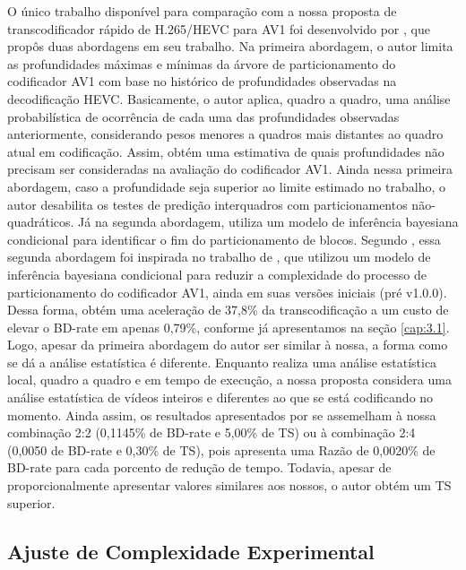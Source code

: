 O único trabalho disponível para comparação com a nossa proposta de transcodificador rápido de H.265/HEVC para AV1 foi desenvolvido por \citet{bib:chen_2019}, que propôs duas abordagens em seu trabalho. Na primeira abordagem, o autor limita as profundidades máximas e mínimas da árvore de particionamento do codificador AV1 com base no histórico de profundidades observadas na decodificação HEVC. Basicamente, o autor aplica, quadro a quadro, uma análise probabilística de ocorrência de cada uma das profundidades observadas anteriormente, considerando pesos menores a quadros mais distantes ao quadro atual em codificação. Assim, obtém uma estimativa de quais profundidades não precisam ser consideradas na avaliação do codificador AV1. Ainda nessa primeira abordagem, caso a profundidade seja superior ao limite estimado no trabalho, o autor desabilita os testes de predição interquadros com particionamentos não-quadráticos. Já na segunda abordagem, \citet{bib:chen_2019} utiliza um modelo de inferência bayesiana condicional \cite{bib:bayesian_ref} para identificar o fim do particionamento de blocos. Segundo \citet{bib:chen_2019}, essa segunda abordagem foi inspirada no trabalho de \cite{bib:guo2_2018}, que utilizou um modelo de inferência bayesiana condicional para reduzir a complexidade do processo de particionamento do codificador AV1, ainda em suas versões iniciais (pré v1.0.0). Dessa forma, \citet{bib:chen_2019} obtém uma aceleração de 37,8\% da transcodificação a um custo de elevar o BD-rate em apenas 0,79\%, conforme já apresentamos na seção \ref{cap:3.1}. Logo, apesar da primeira abordagem do autor ser similar à nossa, a forma como se dá a análise estatística é diferente. Enquanto \citet{bib:chen_2019} realiza uma análise estatística local, quadro a quadro e em tempo de execução, a nossa proposta considera uma análise estatística de vídeos inteiros e diferentes ao que se está codificando no momento. Ainda assim, os resultados apresentados por \citet{bib:chen_2019} se assemelham à nossa combinação 2:2 (0,1145\% de BD-rate e 5,00\% de TS) ou à combinação 2:4 (0,0050 de BD-rate e 0,30\% de TS), pois \citet{bib:chen_2019} apresenta uma Razão de 0,0020\% de BD-rate para cada porcento de redução de tempo. Todavia, apesar de proporcionalmente \citet{bib:chen_2019} apresentar valores similares aos nossos, o autor obtém um TS superior.

\subsection{Ajuste de Complexidade Experimental}
\label{cap:6.1.3}

